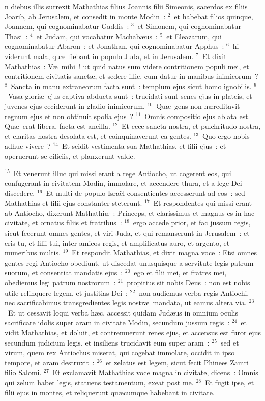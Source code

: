 \bchapter
{}n diebus illis surrexit Mathathias filius Joannis filii Simeonis, sacerdos ex filiis Joarib, ab Jerusalem, et consedit in monte Modin~:
${}^{2}$~et habebat filios quinque, Joannem, qui cognominabatur Gaddis~:
${}^{3}$~et Simonem, qui cognominabatur Thasi~:
${}^{4}$~et Judam, qui vocabatur Machab\ae us~:
${}^{5}$~et Eleazarum, qui cognominabatur Abaron~: et Jonathan, qui cognominabatur Apphus~:
${}^{6}$~hi viderunt mala, qu\ae\ fiebant in populo Juda, et in Jerusalem.
${}^{7}$~Et dixit Mathathias~: V\ae\ mihi~! ut quid natus sum videre contritionem populi mei, et contritionem civitatis sanct\ae , et sedere illic, cum datur in manibus inimicorum~?
${}^{8}$~Sancta in manu extraneorum facta sunt~: templum ejus sicut homo ignobilis.
${}^{9}$~Vasa glori\ae\ ejus captiva abducta sunt~: trucidati sunt senes ejus in plateis, et juvenes ejus ceciderunt in gladio inimicorum.
${}^{10}$~Qu\ae\ gens non h\ae reditavit regnum ejus et non obtinuit spolia ejus~?
${}^{11}$~Omnis compositio ejus ablata est. Qu\ae\ erat libera, facta est ancilla.
${}^{12}$~Et ecce sancta nostra, et pulchritudo nostra, et claritas nostra desolata est, et coinquinaverunt ea gentes.
${}^{13}$~Quo ergo nobis adhuc vivere~?
${}^{14}$~Et scidit vestimenta sua Mathathias, et filii ejus~: et operuerunt se ciliciis, et planxerunt valde.


${}^{15}$~Et venerunt illuc qui missi erant a rege Antiocho, ut cogerent eos, qui confugerant in civitatem Modin, immolare, et accendere thura, et a lege Dei discedere.
${}^{16}$~Et multi de populo Isra\"el consentientes accesserunt ad eos~: sed Mathathias et filii ejus constanter steterunt.
${}^{17}$~Et respondentes qui missi erant ab Antiocho, dixerunt Mathathi\ae~: Princeps, et clarissimus et magnus es in hac civitate, et ornatus filiis et fratribus~:
${}^{18}$~ergo accede prior, et fac jussum regis, sicut fecerunt omnes gentes, et viri Juda, et qui remanserunt in Jerusalem~: et eris tu, et filii tui, inter amicos regis, et amplificatus auro, et argento, et muneribus multis.
${}^{19}$~Et respondit Mathathias, et dixit magna voce~: Etsi omnes gentes regi Antiocho obediunt, ut discedat unusquisque a servitute legis patrum suorum, et consentiat mandatis ejus~:
${}^{20}$~ego et filii mei, et fratres mei, obediemus legi patrum nostrorum~:
${}^{21}$~propitius sit nobis Deus~: non est nobis utile relinquere legem, et justitias Dei~:
${}^{22}$~non audiemus verba regis Antiochi, nec sacrificabimus transgredientes legis nostr\ae\ mandata, ut eamus altera via.
${}^{23}$~Et ut cessavit loqui verba h\ae c, accessit quidam Jud\ae us in omnium oculis sacrificare idolis super aram in civitate Modin, secundum jussum regis~:
${}^{24}$~et vidit Mathathias, et doluit, et contremuerunt renes ejus, et accensus est furor ejus secundum judicium legis, et insiliens trucidavit eum super aram~:
${}^{25}$~sed et virum, quem rex Antiochus miserat, qui cogebat immolare, occidit in ipso tempore, et aram destruxit~:
${}^{26}$~et zelatus est legem, sicut fecit Phinees Zamri filio Salomi.
${}^{27}$~Et exclamavit Mathathias voce magna in civitate, dicens~: Omnis qui zelum habet legis, statuens testamentum, exeat post me.
${}^{28}$~Et fugit ipse, et filii ejus in montes, et reliquerunt qu\ae cumque habebant in civitate.


